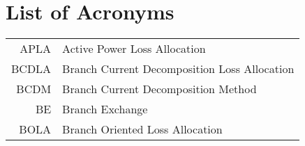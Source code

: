 \chapter*{List of Acronyms} \label{acronyms}
\begin{center}
\begin{longtable}{Rp{10cm}}

APLA &  	Active Power Loss Allocation \\
BCDLA	&  	Branch Current Decomposition Loss Allocation \\
BCDM	&	Branch Current Decomposition Method \\
BE	&	Branch Exchange \\
BOLA	&	Branch Oriented Loss Allocation \\

\end{longtable}
\end{center}

              

